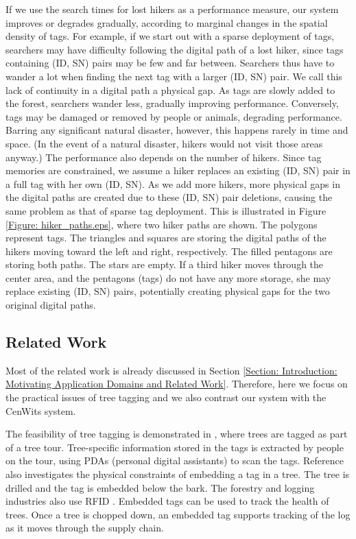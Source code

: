 If we use the search times for lost hikers as a performance measure, our system improves or degrades gradually, according to marginal changes in the spatial density of tags.  For example, if we start out with a sparse deployment of tags, searchers may have difficulty following the digital path of a lost hiker, since tags containing (ID, SN) pairs may be few and far between.  Searchers thus have to wander a lot when finding the next tag with a larger (ID, SN) pair.  We call this lack of continuity in a digital path a physical gap.  As tags are slowly added to the forest, searchers wander less, gradually improving performance.  Conversely, tags may be damaged or removed by people or animals, degrading performance.  Barring any significant natural disaster, however, this happens rarely in time and space.  (In the event of a natural disaster, hikers would not visit those areas anyway.)  The performance also depends on the number of hikers.  Since tag memories are constrained, we assume a hiker replaces an existing (ID, SN) pair in a full tag with her own (ID, SN).  As we add more hikers, more physical gaps in the digital paths are created due to these (ID, SN) pair deletions, causing the same problem as that of sparse tag deployment.  This is illustrated in Figure \ref{Figure: hiker_paths.eps}, where two hiker paths are shown. The polygons represent tags.  The triangles and squares are storing the digital paths of the hikers moving toward the left and right, respectively.  The filled pentagons are storing both paths.  The stars are empty.  If a third hiker moves through the center area, and the pentagons (tags) do not have any more storage, she may replace existing (ID, SN) pairs, potentially creating physical gaps for the two original digital paths.

\subsection{Related Work}
\label{Section: Tracking Protocols: Forest Search and Rescue: Related Work}
Most of the related work is already discussed in Section \ref{Section: Introduction: Motivating Application Domains and Related Work}. Therefore, here we focus on the practical issues of tree tagging and we also contrast our system with the CenWits system.

The feasibility of tree tagging is demonstrated in \cite{2003 Hoyt}, where trees are tagged as part of a tree tour. Tree-specific information stored in the tags is extracted by people on the tour, using PDAs (personal digital assistants) to scan the tags.  Reference \cite{2003 Hoyt} also investigates the physical constraints of embedding a tag in a tree.  The tree is drilled and the tag is embedded below the bark.  The forestry and logging industries also use RFID \cite{Discover RFID}.  Embedded tags can be used to track the health of trees.  Once a tree is chopped down, an embedded tag supports tracking of the log as it moves through the supply chain.

